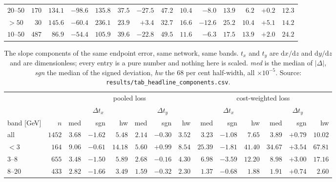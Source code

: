 \documentclass[11pt,a4paper]{article}
\begin{document}
\begin{table}[tbp]
\begin{tabular}{lrrrrrrrrrrrrr}
    $20$--$50$ & $170$  & $134.1$ & $-98.6$ & $135.8$ & $37.5$ & $-27.5$ & $47.2$  & $10.4$  & $-8.0$   & $13.9$  & $6.2$   & $+0.2$   & $12.3$ \\
    $>50$      & $30$   & $145.6$ & $-60.4$ & $236.1$ & $23.9$ & $+3.4$  & $32.7$  & $16.6$  & $-12.6$  & $25.2$  & $10.4$  & $+5.1$   & $14.2$ \\
    $10$--$50$ & $487$  & $86.9$  & $-54.4$ & $105.9$ & $39.6$ & $-22.8$ & $49.5$  & $11.6$  & $-6.3$   & $17.5$  & $13.9$  & $+2.0$   & $24.2$ \\
    \bottomrule
  \end{tabular}
\end{table}

\begin{table}[tbp]
  \centering
  \caption{The slope components of the same endpoint error, same network, same
  bands. $t_x$ and $t_y$ are $\mathrm{d}x/\mathrm{d}z$ and
  $\mathrm{d}y/\mathrm{d}z$ and are dimensionless; every entry is a pure number
  and nothing here is scaled. \emph{med} is the median of $|\Delta|$,
  \emph{sgn} the median of the signed deviation, \emph{hw} the $68$ per cent
  half-width, all $\times 10^{-5}$. Source:
  \texttt{results/tab\_headline\_components.csv}.}
  \label{tab:compslope}
  \footnotesize
  \setlength{\tabcolsep}{3pt}
  \begin{tabular}{lrrrrrrrrrrrrr}
    \toprule
    & & \multicolumn{6}{c}{pooled loss} & \multicolumn{6}{c}{cost-weighted loss} \\
    \cmidrule(lr){3-8}\cmidrule(lr){9-14}
    & & \multicolumn{3}{c}{$\Delta t_x$} & \multicolumn{3}{c}{$\Delta t_y$}
      & \multicolumn{3}{c}{$\Delta t_x$} & \multicolumn{3}{c}{$\Delta t_y$} \\
    \cmidrule(lr){3-5}\cmidrule(lr){6-8}\cmidrule(lr){9-11}\cmidrule(lr){12-14}
    band [GeV] & $n$ & med & sgn & hw & med & sgn & hw & med & sgn & hw & med & sgn & hw \\
    \midrule
    all        & $1452$ & $3.68$ & $-1.62$ & $5.48$  & $2.14$ & $-0.30$ & $3.52$ & $3.23$  & $-1.08$ & $7.65$  & $3.89$  & $+0.79$ & $10.02$ \\
    $<3$       & $164$  & $9.06$ & $-0.61$ & $14.18$ & $5.60$ & $+0.99$ & $8.54$ & $25.39$ & $-1.81$ & $41.40$ & $34.67$ & $+3.54$ & $67.81$ \\
    $3$--$8$   & $655$  & $3.48$ & $-1.50$ & $5.89$  & $2.68$ & $-0.16$ & $4.30$ & $6.98$  & $-3.59$ & $12.20$ & $8.98$  & $+3.00$ & $17.16$ \\
    $8$--$20$  & $433$  & $2.82$ & $-1.66$ & $3.49$  & $1.59$ & $-0.32$ & $2.30$ & $1.37$  & $-0.68$ & $1.88$  & $1.91$  & $+0.74$ & $2.60$ \\

\end{tabular}
\end{table}
\end{document}
